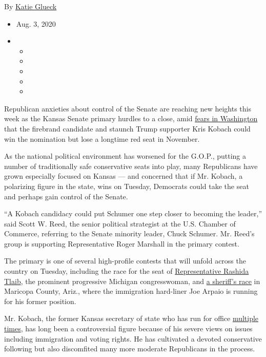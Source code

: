 By \href{https://www.nytimes.com/by/katie-glueck}{Katie Glueck}

\begin{itemize}
\item
  Aug. 3, 2020
\item
  \begin{itemize}
  \item
  \item
  \item
  \item
  \item
  \end{itemize}
\end{itemize}

Republican anxieties about control of the Senate are reaching new
heights this week as the Kansas Senate primary hurdles to a close, amid
\href{https://www.nytimes.com/2020/07/30/us/politics/kansas-senate-kobach-trump.html}{fears
in Washington} that the firebrand candidate and staunch Trump supporter
Kris Kobach could win the nomination but lose a longtime red seat in
November.

As the national political environment has worsened for the G.O.P.,
putting a number of traditionally safe conservative seats into play,
many Republicans have grown especially focused on Kansas --- and
concerned that if Mr. Kobach, a polarizing figure in the state, wins on
Tuesday, Democrats could take the seat and perhaps gain control of the
Senate.

``A Kobach candidacy could put Schumer one step closer to becoming the
leader,'' said Scott W. Reed, the senior political strategist at the
U.S. Chamber of Commerce, referring to the Senate minority leader, Chuck
Schumer. Mr. Reed's group is supporting Representative Roger Marshall in
the primary contest.

The primary is one of several high-profile contests that will unfold
across the country on Tuesday, including the race for the seat of
\href{https://www.nytimes.com/2020/07/18/us/rashida-tlaib-brenda-jones-primary.html}{Representative
Rashida Tlaib}, the prominent progressive Michigan congresswoman, and
\href{https://www.nytimes.com/2020/08/02/us/politics/arizona-election-joe-arpaio.html}{a
sheriff's race} in Maricopa County, Ariz., where the immigration
hard-liner Joe Arpaio is running for his former position.

Mr. Kobach, the former Kansas secretary of state who has run for office
\href{https://www.nytimes.com/2017/06/13/magazine/the-man-behind-trumps-voter-fraud-obsession.html}{multiple
times}, has long been a controversial figure because of his severe views
on issues including immigration and voting rights. He has cultivated a
devoted conservative following but also discomfited many more moderate
Republicans in the process.

